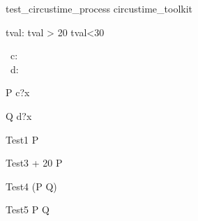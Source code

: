 \begin{zsection}
   \SECTION test\_circustime\_process \parents circustime\_toolkit
\end{zsection}

\begin{axdef}
   tval: \nat
\where
   tval > 20 \land tval<30
\end{axdef}

\begin{circus}
     \circchannel\ c: \nat \\
     \circchannel\ d: \nat \\
\end{circus}

\begin{circus}
    \circprocess P \circdef \circbegin \circspot c?x \then \Skip \circend \\
\end{circus}


\begin{circus}
    \circprocess Q \circdef \circbegin \circspot d?x \then \Skip \circend \\
\end{circus}


\begin{circus}
   \circprocess Test1 \circdef  {} \rcirctime \circstartby P  \\
\end{circus}




\begin{circus}
   \circprocess Test3 \circdef  {} + 20 \rcirctime \circstartby P  \\
\end{circus}


\begin{circus}
   \circprocess Test4 \circdef  {} \rcirctime \circstartby (P \circseq Q) \\
\end{circus}


 \begin{circus}
    \circprocess Test5 \circdef  {} \rcirctime \circstartby P  \circseq Q\\
 \end{circus}


